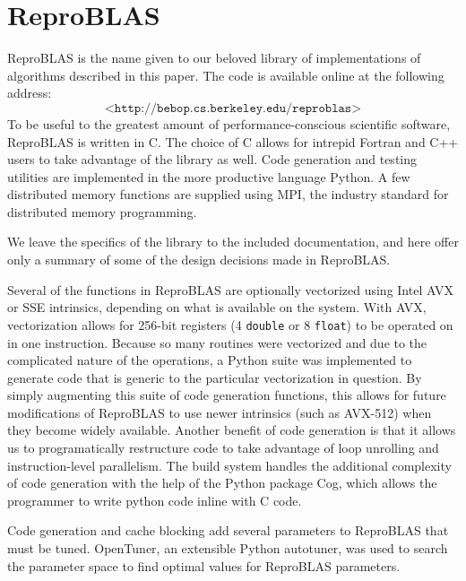 \section{ReproBLAS}
  \label{sec:reproBLAS}
  ReproBLAS is the name given to our beloved library of implementations of algorithms described in this paper.
  The code is available online at the following address:
  \[
  \texttt{<http://bebop.cs.berkeley.edu/reproblas>}
  \]
  To be useful to the greatest amount of performance-conscious scientific software, ReproBLAS is written in C.
  The choice of C allows for intrepid Fortran and C++ users to take advantage of the library as well.
  Code generation and testing utilities are implemented in the more productive language Python.
  A few distributed memory functions are supplied using MPI, the industry standard for distributed memory programming.

  We leave the specifics of the library to the included documentation, and here offer only a summary of some of the design decisions made in ReproBLAS.

  Several of the functions in ReproBLAS are optionally vectorized using Intel AVX or SSE intrinsics, depending on what is available on the system. With AVX, vectorization allows for 256-bit registers (4 \texttt{double} or 8 \texttt{float}) to be operated on in one instruction. Because so many routines were vectorized and due to the complicated nature of the operations, a Python suite was implemented to generate code that is generic to the particular vectorization in question. By simply augmenting this suite of code generation functions, this allows for future modifications of ReproBLAS to use newer intrinsics (such as AVX-512) when they become widely available. Another benefit of code generation is that it allows us to programatically restructure code to take advantage of loop unrolling and instruction-level parallelism. The build system handles the additional complexity of code generation with the help of the Python package Cog, which allows the programmer to write python code inline with C code.

  Code generation and cache blocking add several parameters to ReproBLAS that must be tuned. OpenTuner, an extensible Python autotuner, was used to search the parameter space to find optimal values for ReproBLAS parameters.

